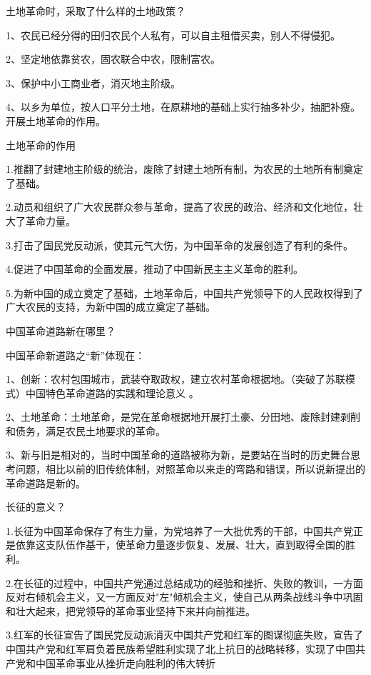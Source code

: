 \documentclass[lang=cn,10pt]{elegantbook}
\begin{document}
	\begin{example}
		土地革命时，采取了什么样的土地政策？
	\end{example}
	\begin{solution}
		1、农民已经分得的田归农民个人私有，可以自主租借买卖，别人不得侵犯。

		2、坚定地依靠贫农，固农联合中农，限制富农。

		3、保护中小工商业者，消灭地主阶级。

		4、以乡为单位，按人口平分土地，在原耕地的基础上实行抽多补少，抽肥补瘦。
开展土地革命的作用。
	\end{solution}
	\begin{example}
		土地革命的作用
	\end{example}
	\begin{solution}
		1.推翻了封建地主阶级的统治，废除了封建土地所有制，为农民的土地所有制奠定了基础。
		
		2.动员和组织了广大农民群众参与革命，提高了农民的政治、经济和文化地位，壮大了革命力量。
		
		3.打击了国民党反动派，使其元气大伤，为中国革命的发展创造了有利的条件。
		
		4.促进了中国革命的全面发展，推动了中国新民主主义革命的胜利。
		
		5.为新中国的成立奠定了基础，土地革命后，中国共产党领导下的人民政权得到了广大农民的支持，为新中国的成立奠定了基础。
	\end{solution}
	\begin{example}
		中国革命道路新在哪里？
	\end{example}
	\begin{solution}
		
		中国革命新道路之“新”体现在：
		
		1、创新：农村包围城市，武装夺取政权，建立农村革命根据地。（突破了苏联模式）中国特色革命道路的实践和理论意义 。
		
		2、土地革命：土地革命，是党在革命根据地开展打土豪、分田地、废除封建剥削和债务，满足农民土地要求的革命。
		
		3、新与旧是相对的，当时中国革命的道路被称为新，是要站在当时的历史舞台思考问题，相比以前的旧传统体制，对照革命以来走的弯路和错误，所以说新提出的革命道路是新的。
	\end{solution}
	\begin{example}
		长征的意义？
	\end{example}
	\begin{solution}
		
		1.长征为中国革命保存了有生力量，为党培养了一大批优秀的干部，中国共产党正是依靠这支队伍作基干，使革命力量逐步恢复、发展、壮大，直到取得全国的胜利。
		
		2.在长征的过程中，中国共产党通过总结成功的经验和挫折、失败的教训，一方面反对右倾机会主义，又一方面反对"左"倾机会主义，使自己从两条战线斗争中巩固和壮大起来，把党领导的革命事业坚持下来并向前推进。
		
		3.红军的长征宣告了国民党反动派消灭中国共产党和红军的图谋彻底失败，宣告了中国共产党和红军肩负着民族希望胜利实现了北上抗日的战略转移，实现了中国共产党和中国革命事业从挫折走向胜利的伟大转折
	\end{solution}
\end{document}
